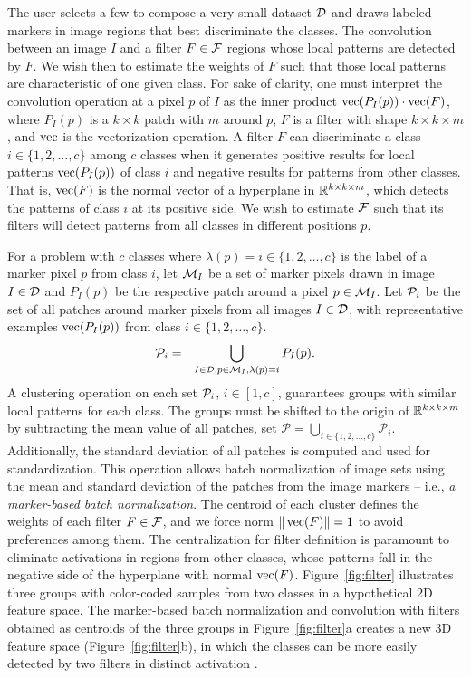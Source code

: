The user selects a few  to compose a very small dataset $\mathcal{D}$ and draws labeled markers in image regions that best discriminate the classes. The convolution between an image $I$ and a filter $F\in {\cal F}$  regions whose local patterns are detected by $F$. We wish then to estimate the weights of $F$ such that those local patterns are characteristic of one given class. For sake of clarity, one must interpret the convolution operation at a pixel $p$ of $I$ as the inner product $\operatorname{vec}(P_I(p)) \cdot \operatorname{vec}(F)$, where $P_I(p)$ is a $k\times k$ patch with $m$  around $p$, $F$ is a filter with shape $k\times k \times m$, and $\operatorname{vec}$ is the vectorization operation. A filter $F$ can discriminate a class $i \in \{1,2,\ldots,c\}$ among $c$ classes when it generates positive results for local patterns $\operatorname{vec}(P_I(p))$ of class $i$ and negative results for patterns from other classes. That is, $\operatorname{vec}(F)$ is the normal vector of a hyperplane in $\mathbb{R}^{k\times k\times m}$, which detects the patterns of class $i$ at its positive side. We wish to estimate ${\cal F}$ such that its filters will detect patterns from all classes in different positions $p$. 

For a problem with $c$ classes where $\lambda(p)=i\in \{1,2,\ldots,c\}$ is the label of a marker pixel $p$ from class $i$, let ${\cal M}_I$ be a set of marker pixels drawn in image $I\in {\cal D}$ and $P_I(p)$ be the respective patch around a pixel $p\in {\cal M}_I$. Let ${\cal P}_i$ be the set of all patches around marker pixels from all images $I\in {\cal D}$, with representative examples  $\operatorname{vec}(P_I(p))$ from class $i\in \{1,2,\ldots,c\}$. 
\begin{eqnarray}
{\cal P}_i & = & \bigcup_{I\in {\cal D},p\in {\cal M}_I, \lambda(p) = i}{P_I(p)}.
\label{eq:pset}
\end{eqnarray}
A clustering operation on each set ${\cal P}_i$, $i\in [1,c]$, guarantees groups with similar local patterns for each class. The groups must be shifted to the origin of $\mathbb{R}^{k\times k\times m}$ by subtracting the mean value of all patches, set $\mathcal{P} = \bigcup_{i \in \{1, 2, \ldots, c\}}{\mathcal{P}_i}$. Additionally, the standard deviation of all patches is computed and used for standardization. This operation allows batch normalization of image sets using the mean and standard deviation of the patches from the image markers -- i.e.,  \emph{a marker-based batch normalization}. The centroid of each cluster defines the weights of each filter $F\in {\cal F}$, and we force norm $\|\operatorname{vec}(F)\|=1$ to avoid preferences among them. The centralization for filter definition is paramount to eliminate activations in regions from other classes, whose patterns fall in the negative side of the hyperplane with normal $\operatorname{vec}(F)$. Figure~\ref{fig:filter} illustrates three groups with color-coded samples from two classes in a hypothetical 2D feature space. The marker-based batch normalization and convolution with filters obtained as centroids of the three groups in Figure~\ref{fig:filter}a creates a new 3D feature space (Figure~\ref{fig:filter}b), in which the classes can be more easily detected by two filters in distinct activation .

